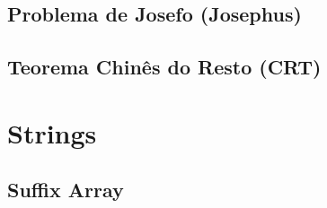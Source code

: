 % 

\subsection{Problema de Josefo (Josephus)}


% 

% 

% 

% 

% 

\subsection{Teorema Chinês do Resto (CRT)}


\section{Strings}

\subsection{Suffix Array}


